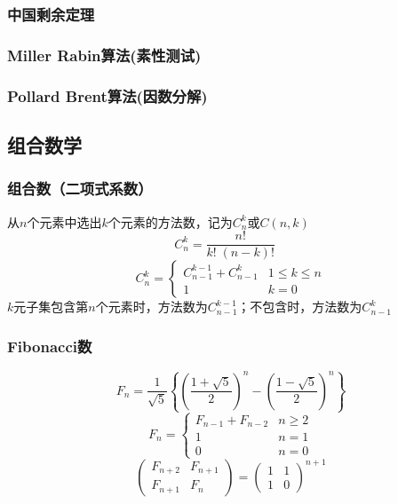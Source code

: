 \subsubsection{中国剩余定理}
\subsubsection{Miller Rabin算法(素性测试)}
\subsubsection{Pollard Brent算法(因数分解)}

\subsection{组合数学}
\subsubsection{组合数（二项式系数）}
从$n$个元素中选出$k$个元素的方法数，记为$C_{n}^{k}$或$C(n, k)$
\begin{displaymath}
C_n^k = \frac{n!}{k!\;(n-k)!} \quad
\end{displaymath}
\begin{displaymath}
C_{n}^{k} = 
\begin{cases}
C_{n-1}^{k-1} + C_{n-1}^{k} & 1 \leqslant k \leqslant n\\
1 & k=0
\end{cases}
\end{displaymath}
$k$元子集包含第$n$个元素时，方法数为$ C_{n-1}^{k-1}$；不包含时，方法数为$C_{n-1}^{k}$\\

\subsubsection{Fibonacci数}
\begin{displaymath}
F_{n} = \frac{1}{\sqrt{5}}\left\{\left(\frac{1+\sqrt{5}}{2}\right)^n - \left(\frac{1-\sqrt{5}}{2}\right)^n\right\}
\end{displaymath}
\begin{displaymath}
F_{n} = 
\begin{cases}
F_{n-1}+ F_{n-2} & n \geqslant 2\\
1 & n=1\\
0 & n=0
\end{cases}
\end{displaymath}
\begin{displaymath}
\begin{pmatrix} F_{n+2} & F_{n+1} \\ F_{n+1} & F_{n} \end{pmatrix}
=
\begin{pmatrix} 1 & 1 \\ 1 & 0 \end{pmatrix}^{n + 1}
\end{displaymath}


